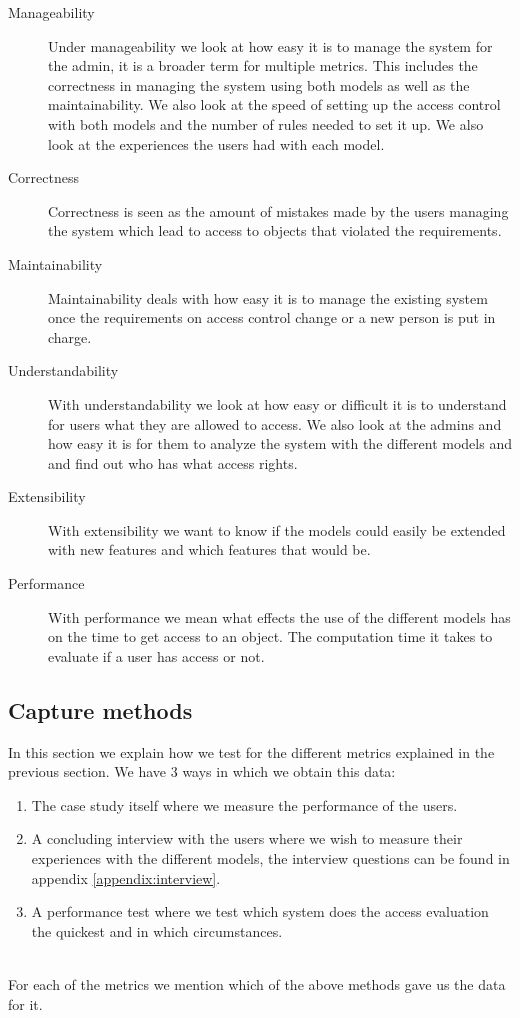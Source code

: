 \begin{description}
    \item [Manageability] Under manageability  we  look  at  how  easy  it  is to  manage the system for the admin, it is a broader term for multiple metrics.
    This includes the correctness in managing the system using both models as well as the maintainability.
    We also look at the speed of setting up the access control with both models and the number of rules needed to set it up.
    We also look at the experiences the users had with each model.
    \item [Correctness]  Correctness is seen as the amount of mistakes made by the users managing the system which lead to access to objects that violated the requirements.
    \item [Maintainability] Maintainability deals with how easy it is to manage the existing system once the requirements on access control change or a new person is put in charge.
    \item [Understandability] With understandability  we  look  at  how  easy or difficult it is to understand for users what they are allowed to access.
    We also look at the admins and how easy it is for them to analyze the system with the different models and  and find out who has what access rights.
    \item [Extensibility] With extensibility  we want to know if the models could easily be extended with new features and which features that would be.
    \item [Performance] With performance we mean what effects the use of the different models has on the time to get access to an object. 
    The computation time it takes to evaluate if a user has access or not.
\end{description}

\subsection{Capture methods}
In this section we explain how we test for the different metrics explained in the previous section.
We have 3 ways in which we obtain this data:

\begin{enumerate}
    \item The case study itself where we measure the performance of the users.
    \item A concluding interview with the users where we wish to measure their experiences with the different models, the interview questions can be found in appendix \ref{appendix:interview}.
    \item A performance test where we test which system does the access evaluation the quickest and in which circumstances.
\end{enumerate}
\\
For each of the metrics we mention which of the above methods gave us the data for it.

